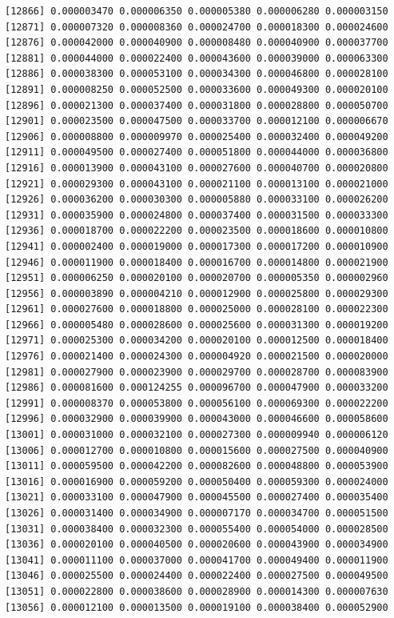 \documentclass[]{article}
\begin{document}
\begin{verbatim}
[12866] 0.000003470 0.000006350 0.000005380 0.000006280 0.000003150
[12871] 0.000007320 0.000008360 0.000024700 0.000018300 0.000024600
[12876] 0.000042000 0.000040900 0.000008480 0.000040900 0.000037700
[12881] 0.000044000 0.000022400 0.000043600 0.000039000 0.000063300
[12886] 0.000038300 0.000053100 0.000034300 0.000046800 0.000028100
[12891] 0.000008250 0.000052500 0.000033600 0.000049300 0.000020100
[12896] 0.000021300 0.000037400 0.000031800 0.000028800 0.000050700
[12901] 0.000023500 0.000047500 0.000033700 0.000012100 0.000006670
[12906] 0.000008800 0.000009970 0.000025400 0.000032400 0.000049200
[12911] 0.000049500 0.000027400 0.000051800 0.000044000 0.000036800
[12916] 0.000013900 0.000043100 0.000027600 0.000040700 0.000020800
[12921] 0.000029300 0.000043100 0.000021100 0.000013100 0.000021000
[12926] 0.000036200 0.000030300 0.000005880 0.000033100 0.000026200
[12931] 0.000035900 0.000024800 0.000037400 0.000031500 0.000033300
[12936] 0.000018700 0.000022200 0.000023500 0.000018600 0.000010800
[12941] 0.000002400 0.000019000 0.000017300 0.000017200 0.000010900
[12946] 0.000011900 0.000018400 0.000016700 0.000014800 0.000021900
[12951] 0.000006250 0.000020100 0.000020700 0.000005350 0.000002960
[12956] 0.000003890 0.000004210 0.000012900 0.000025800 0.000029300
[12961] 0.000027600 0.000018800 0.000025000 0.000028100 0.000022300
[12966] 0.000005480 0.000028600 0.000025600 0.000031300 0.000019200
[12971] 0.000025300 0.000034200 0.000020100 0.000012500 0.000018400
[12976] 0.000021400 0.000024300 0.000004920 0.000021500 0.000020000
[12981] 0.000027900 0.000023900 0.000029700 0.000028700 0.000083900
[12986] 0.000081600 0.000124255 0.000096700 0.000047900 0.000033200
[12991] 0.000008370 0.000053800 0.000056100 0.000069300 0.000022200
[12996] 0.000032900 0.000039900 0.000043000 0.000046600 0.000058600
[13001] 0.000031000 0.000032100 0.000027300 0.000009940 0.000006120
[13006] 0.000012700 0.000010800 0.000015600 0.000027500 0.000040900
[13011] 0.000059500 0.000042200 0.000082600 0.000048800 0.000053900
[13016] 0.000016900 0.000059200 0.000050400 0.000059300 0.000024000
[13021] 0.000033100 0.000047900 0.000045500 0.000027400 0.000035400
[13026] 0.000031400 0.000034900 0.000007170 0.000034700 0.000051500
[13031] 0.000038400 0.000032300 0.000055400 0.000054000 0.000028500
[13036] 0.000020100 0.000040500 0.000020600 0.000043900 0.000034900
[13041] 0.000011100 0.000037000 0.000041700 0.000049400 0.000011900
[13046] 0.000025500 0.000024400 0.000022400 0.000027500 0.000049500
[13051] 0.000022800 0.000038600 0.000028900 0.000014300 0.000007630
[13056] 0.000012100 0.000013500 0.000019100 0.000038400 0.000052900

\end{verbatim}
\end{document}
